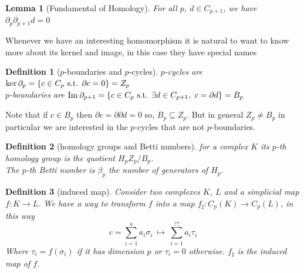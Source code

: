 \documentclass{article}
\newcommand{\img}{\textmd{Im}\:}
\newcommand{\st}{\textmd{ s.t. }}
\newtheorem{definition}{Definition}[section]
\newtheorem{lemma}{Lemma}[section]
\begin{document}
\begin{lemma}[Fundamental of Homology]
	For all $p$, $d \in C_{p+1}$, we have $ \partial_{p} \partial_{p+1} d = 0$
\end{lemma}

Whenever we have an interesting homomorphism it is natural to want to know more about its kernel and image, in this case they have special names
\begin{definition}[$p$-boundaries and $p$-cycles]
	$p$-cycles are $ \ker\partial_{p} = \{ c \in C_p \st \partial c = 0 \} = Z_p $\\
	$p$-boundaries are $ \img\partial_{p+1} = \{ c \in C_p \st \exists d \in C_{p+1} , \ c=\partial d \} = B_p $
\end{definition}

Note that if $ c \in B_p $ then $ \partial c = \partial \partial d = 0 $ so, $ B_p \subseteq Z_p $. But in general $ Z_p \neq B_p $ in particular we are interested in the $p$-cycles that are not $p$-boundaries.
\begin{definition}[homology groups and Betti numbers]
	for a complex $K$ its $p$-th homology group is the quotient $H_p Z_p/B_p $.\\
	The $p$-th Betti number is $ \beta_p $ the number of generators of $H_p$.
\end{definition} 


\begin{definition}[induced map]
	Consider two complexes $K$, $L$ and a simplicial map $ f: K \to L $. We have a way to transform $f$ into a map $ f_\sharp: C_p(K) \to C_p(L) $, in this way 
	\[ c = \sum_{i=1}^n a_i \sigma_i \ \mapsto \ \sum_{i=1}^{??} a_i \tau_i  \]
	Where $ \tau_i = f(\sigma_i) $ if it has dimension $p$ or $ \tau_i =0 $ otherwise. $f_\sharp$ is the induced map of $f$.
\end{definition}

\end{document}
